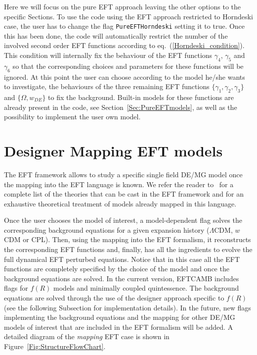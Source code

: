 \documentclass[prd,nofootinbib,showpacs]{revtex4}
\begin{document}
{Here we will focus on the pure EFT approach leaving the other options to the specific Sections. To use the code using the EFT approach restricted to Horndeski case, the user has to change the flag \verb|PureEFTHorndeski| setting it to true. Once this has been done, the code will  automatically restrict the number of the involved second order EFT functions according to eq.~(\ref{Horndeski_condition}). This condition will internally  fix the behaviour of the EFT functions $\gamma_4$, $\gamma_5$ and $\gamma_6$ so that the corresponding choices and parameters for these functions will be ignored. At this point the user can choose according to the model he/she wants to investigate, the behaviours of the three remaining EFT functions $\{\gamma_1,\gamma_2,\gamma_3\}$  and  $\{\Omega, w_{DE}\}$ to fix the background. Built-in models for these functions are already present in the code, see Section~\ref{Sec:PureEFTmodels}, as well as the possibility to implement the user own model.

\section{Designer Mapping EFT models}\label{Sec:MatchingEFT}
%
The EFT framework allows to study a specific single field DE/MG model once the mapping into the EFT language is known. We refer the reader to~\cite{Gubitosi:2012hu,Bloomfield:2012ff,Gleyzes:2013ooa,Bloomfield:2013efa} for a complete list of the theories that can be cast in the EFT framework and  for an exhaustive theoretical treatment of models already mapped in this language. 

Once the user chooses the model of interest, a model-dependent flag solves the corresponding background equations for a given expansion history ($\Lambda$CDM, $w$CDM or CPL). Then, using the mapping into the EFT formalism, it reconstructs the corresponding EFT functions and, finally, has all the ingredients to evolve the full dynamical EFT perturbed equations.
Notice that in this case all the EFT functions are completely specified by the choice of the model and once the background equations are solved. 
In the current version,  EFTCAMB includes flags for $f(R)$ models and  minimally coupled quintessence. The background equations are solved through the use of the designer approach specific to $f(R)$~\cite{Song:2006ej,Pogosian:2007sw} (see the following Subsection for implementation details). In the future, new flags implementing the background equations and the mapping for other DE/MG models of interest that are included in the EFT formalism will be added. A detailed diagram of the \textit{mapping} EFT case is shown in Figure~\ref{Fig:StructureFlowChart}.
}
\end{document}
